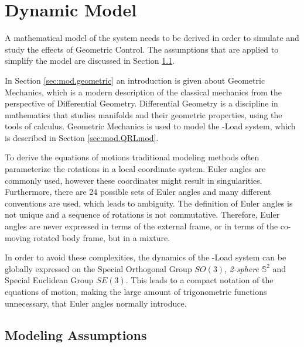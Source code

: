 \chapter{Dynamic Model} \label{ch:model}

A mathematical model of the system needs to be derived in order to simulate and study the effects of Geometric Control. 
The assumptions that are applied to simplify the model are discussed in Section \ref{sec:mod.assum}.

In Section \ref{sec:mod.geometric} an introduction is given about Geometric Mechanics, which is a modern description of the classical mechanics from the perspective of Differential Geometry. Differential Geometry is a discipline in mathematics that studies manifolds and their geometric properties, using the tools of calculus. Geometric Mechanics is used to model the -Load system, which is described in Section \ref{sec:mod.QRLmod}.

To derive the equations of motions traditional modeling methods often parameterize the rotations in a local coordinate system. Euler angles are commonly used, however these coordinates might result in singularities. Furthermore, there are 24 possible sets of Euler angles and many different conventions are used, which leads to ambiguity. The definition of Euler angles is not unique and a sequence of rotations is not commutative. Therefore, Euler angles are never expressed in terms of the external frame, or in terms of the co-moving rotated body frame, but in a mixture.

In order to avoid these complexities, the dynamics of the -Load system can be globally expressed on the Special Orthogonal Group $SO(3)$, \textit{2-sphere} $ \mathbb{S}^2 $ and Special Euclidean Group $ SE(3) $. This leads to a compact notation of the equations of motion, making the large amount of trigonometric functions unnecessary, that Euler angles normally introduce. 

\section{Modeling Assumptions}\label{sec:mod.assum} 


